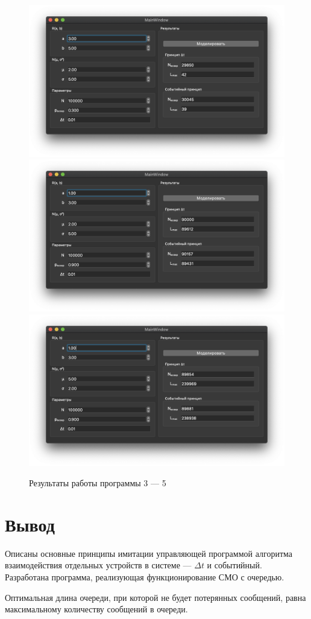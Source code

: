 \documentclass[a4paper,oneside,12pt]{extreport}
\begin{document}
\begin{figure}[H]
	\centering
	\includegraphics[width=0.8\linewidth]{inc/img/result3.png}
	\includegraphics[width=0.8\linewidth]{inc/img/result4.png}
	\includegraphics[width=0.8\linewidth]{inc/img/result5.png}
	\caption{Результаты работы программы 3 — 5}
	\label{img:results-35}
\end{figure}

\chapter*{Вывод}

Описаны основные принципы имитации управляющей программой алгоритма взаимодействия отдельных устройств в системе — $\Delta t$ и событийный.
Разработана программа, реализующая функционирование СМО с очередью.

Оптимальная длина очереди, при которой не будет потерянных сообщений, равна максимальному количеству сообщений в очереди.
\end{document}
